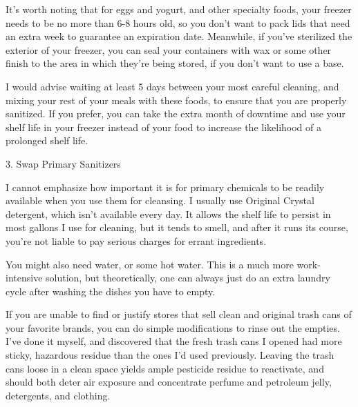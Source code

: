 \documentclass{article}
\theoremstyle{definition}
\begin{document}
\begin{displayquote}
{It's worth noting that for eggs and yogurt, and other specialty foods, your freezer needs to be no more than 6-8 hours old, so you don't want to pack lids that need an extra week to guarantee an expiration date. Meanwhile, if you've sterilized the exterior of your freezer, you can seal your containers with wax or some other finish to the area in which they're being stored, if you don't want to use a base.

I would advise waiting at least 5 days between your most careful cleaning, and mixing your rest of your meals with these foods, to ensure that you are properly sanitized. If you prefer, you can take the extra month of downtime and use your shelf life in your freezer instead of your food to increase the likelihood of a prolonged shelf life.

3. Swap Primary Sanitizers

I cannot emphasize how important it is for primary chemicals to be readily available when you use them for cleansing. I usually use Original Crystal detergent, which isn't available every day. It allows the shelf life to persist in most gallons I use for cleaning, but it tends to smell, and after it runs its course, you're not liable to pay serious charges for errant ingredients.

You might also need water, or some hot water. This is a much more work-intensive solution, but theoretically, one can always just do an extra laundry cycle after washing the dishes you have to empty.

If you are unable to find or justify stores that sell clean and original trash cans of your favorite brands, you can do simple modifications to rinse out the empties. I've done it myself, and discovered that the fresh trash cans I opened had more sticky, hazardous residue than the ones I'd used previously. Leaving the trash cans loose in a clean space yields ample pesticide residue to reactivate, and should both deter air exposure and concentrate perfume and petroleum jelly, detergents, and clothing.
}
\end{displayquote}
\end{document}
